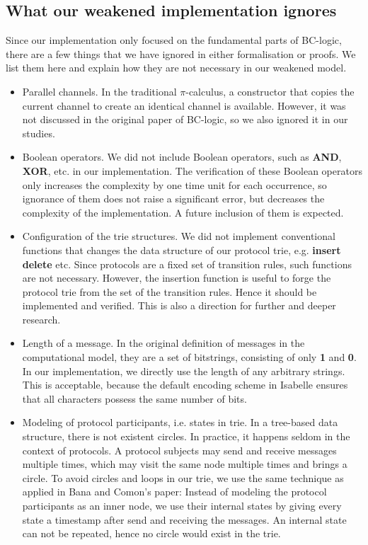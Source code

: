 \documentclass[conference]{IEEEtran}
\begin{document}
\subsection{What our weakened implementation ignores}
Since our implementation only focused on the fundamental parts of BC-logic, there are a few things that we have ignored in either formalisation or proofs. We list them here and explain how they are not necessary in our weakened model.
\begin{itemize}
    \item Parallel channels. In the traditional $\pi$-calculus, a constructor that copies the current channel to create an identical channel is available. However, it was not discussed in the original paper of BC-logic, so we also ignored it in our studies.
    \item Boolean operators. We did not include Boolean operators, such as \textbf{AND}, \textbf{XOR}, etc. in our implementation. The verification of these Boolean operators only increases the complexity by one time unit for each occurrence, so ignorance of them does not raise a significant error, but decreases the complexity of the implementation. A future inclusion of them is expected.
    \item Configuration of the trie structures. We did not implement conventional functions that changes the data structure of our protocol trie, e.g. \textbf{insert} \textbf{delete} etc. Since protocols are a fixed set of transition rules, such functions are not necessary. However, the insertion function is useful to forge the protocol trie from the set of the transition rules. Hence it should be implemented and verified. This is also a direction for further and deeper research.
    \item Length of a message. In the original definition of messages in the computational model, they are a set of bitstrings, consisting of only \textbf{1} and \textbf{0}. In our implementation, we directly use the length of any arbitrary strings. This is acceptable, because the default encoding scheme in Isabelle ensures that all characters possess the same number of bits.
    \item Modeling of protocol participants, i.e. states in trie. In a tree-based data structure, there is not existent circles. In practice, it happens seldom in the context of protocols. A protocol subjects may send and receive messages multiple times, which may visit the same node multiple times and brings a circle. To avoid circles and loops in our trie, we use the same technique as applied in Bana and Comon's paper: Instead of modeling the protocol participants as an inner node, we use their internal states by giving every state a timestamp after send and receiving the messages. An internal state can not be repeated, hence no circle would exist in the trie. 
\end{itemize}
\end{document}
